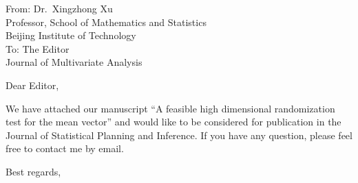 \documentclass[11pt]{letter} %
\begin{document}
    \begin{letter}{From: Dr.\  Xingzhong Xu\\
        Professor, School of Mathematics and Statistics\\
        Beijing Institute of Technology\\
        \vspace{10pt}
        To: The  Editor\\
        Journal of Multivariate Analysis} 



        \signature{Xingzhong Xu\\
        Email address: xuxz@bit.edu.cn}


\opening{Dear Editor,}
We have attached our manuscript ``A feasible high dimensional randomization test for the mean vector'' and would like to be considered for publication in the Journal of Statistical Planning and Inference.
        If you have any question, please feel free to contact me by email.
\closing{Best regards,}
\end{letter}
\end{document}

